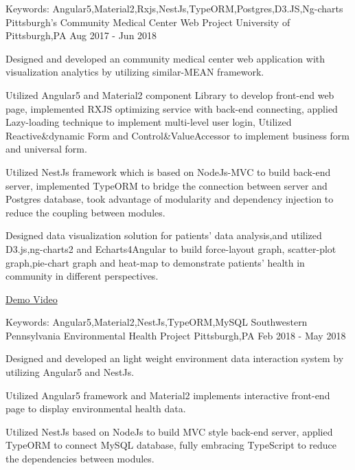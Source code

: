 \begin{cventries}

    \cventry
  	{Keywords: Angular5,Material2,Rxjs,NestJs,TypeORM,Postgres,D3.JS,Ng-charts} %
    {Pittsburgh's Community Medical Center Web Project} %
    {University of Pittsburgh,PA} %
    {Aug 2017 - Jun 2018}  %
    {
      \begin{cvitems}
      	\item {Designed and developed an community medical center web application with visualization analytics by utilizing similar-MEAN framework.}
        \item {Utilized Angular5 and Material2 component Library to develop front-end web page, implemented RXJS optimizing service with back-end connecting, applied Lazy-loading technique to implement multi-level user login, Utilized Reactive\&dynamic Form and Control\&ValueAccessor to implement business form and universal form.}
        \item {Utilized NestJs framework which is based on NodeJs-MVC to build back-end server, implemented TypeORM to bridge the connection between server and Postgres database, took advantage of modularity and dependency injection to reduce the coupling between modules.}
        \item {Designed data visualization solution for patients' data analysis,and utilized D3.js,ng-charts2 and Echarts4Angular to build force-layout graph, scatter-plot graph,pie-chart graph and heat-map to demonstrate patients' health in community in different perspectives.}
	    \item {\href{https://www.youtube.com/watch?v=qYdQ3TKAbvE&t=3s}{Demo Video}}
      \end{cvitems}
    }

  \cventry
   	{Keywords: Angular5,Material2,NestJs,TypeORM,MySQL} %
    {Southwestern Pennsylvania Environmental Health Project} %
    {Pittsburgh,PA} %
    {Feb 2018 - May 2018}  %
    {
      \begin{cvitems}
      	\item {Designed and developed an light weight environment data interaction system by utilizing Angular5 and NestJs.}
        \item {Utilized Angular5 framework and Material2 implements interactive front-end page to display environmental health data.}
        \item {Utilized NestJs based on NodeJs to build MVC style back-end server, applied TypeORM to connect MySQL database, fully embracing TypeScript to reduce the dependencies between modules.}
      \end{cvitems}
    }


\end{cventries}
